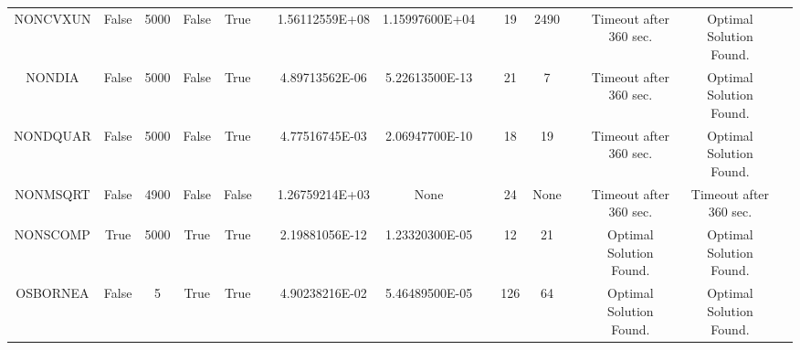\begin{longtable}{ccccccccccccccc}
	\cellcolor{default2} NONCVXUN& \cellcolor{default2} False& \cellcolor{default2} 5000& \cellcolor{default2} False& \cellcolor{default2} True& \cellcolor{header} & \cellcolor{poor} 1.56112559E+08& \cellcolor{best} 1.15997600E+04& \cellcolor{header} & \cellcolor{best} 19& \cellcolor{poor} 2490& \cellcolor{header} & \cellcolor{default2} Timeout after 360 sec.& \cellcolor{default2} Optimal Solution Found.& \cellcolor{header} \\
	\cellcolor{default1} NONDIA& \cellcolor{default1} False& \cellcolor{default1} 5000& \cellcolor{default1} False& \cellcolor{default1} True& \cellcolor{header} & \cellcolor{ok} 4.89713562E-06& \cellcolor{best} 5.22613500E-13& \cellcolor{header} & \cellcolor{poor} 21& \cellcolor{best} 7& \cellcolor{header} & \cellcolor{default1} Timeout after 360 sec.& \cellcolor{default1} Optimal Solution Found.& \cellcolor{header} \\
	\cellcolor{default2} NONDQUAR& \cellcolor{default2} False& \cellcolor{default2} 5000& \cellcolor{default2} False& \cellcolor{default2} True& \cellcolor{header} & \cellcolor{poor} 4.77516745E-03& \cellcolor{best} 2.06947700E-10& \cellcolor{header} & \cellcolor{best} 18& \cellcolor{ok} 19& \cellcolor{header} & \cellcolor{default2} Timeout after 360 sec.& \cellcolor{default2} Optimal Solution Found.& \cellcolor{header} \\
	\cellcolor{default1} NONMSQRT& \cellcolor{default1} False& \cellcolor{default1} 4900& \cellcolor{default1} False& \cellcolor{default1} False& \cellcolor{header} & \cellcolor{best} 1.26759214E+03& \cellcolor{err} None& \cellcolor{header} & \cellcolor{best} 24& \cellcolor{err} None& \cellcolor{header} & \cellcolor{default1} Timeout after 360 sec.& \cellcolor{default1} Timeout after 360 sec.& \cellcolor{header} \\
	\cellcolor{default2} NONSCOMP& \cellcolor{default2} True& \cellcolor{default2} 5000& \cellcolor{default2} True& \cellcolor{default2} True& \cellcolor{header} & \cellcolor{best} 2.19881056E-12& \cellcolor{ok} 1.23320300E-05& \cellcolor{header} & \cellcolor{best} 12& \cellcolor{ok} 21& \cellcolor{header} & \cellcolor{default2} Optimal Solution Found.& \cellcolor{default2} Optimal Solution Found.& \cellcolor{header} \\
	\cellcolor{default1} OSBORNEA& \cellcolor{default1} False& \cellcolor{default1} 5& \cellcolor{default1} True& \cellcolor{default1} True& \cellcolor{header} & \cellcolor{poor} 4.90238216E-02& \cellcolor{best} 5.46489500E-05& \cellcolor{header} & \cellcolor{ok} 126& \cellcolor{best} 64& \cellcolor{header} & \cellcolor{default1} Optimal Solution Found.& \cellcolor{default1} Optimal Solution Found.& \cellcolor{header} \\

\end{longtable}
